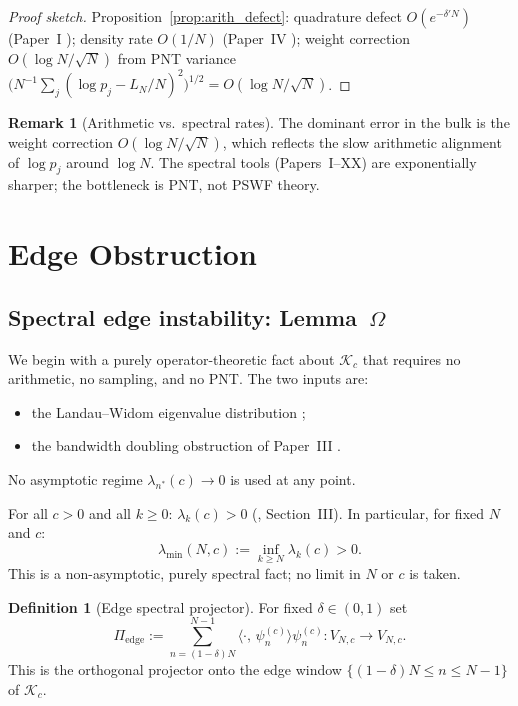 \documentclass[12pt,a4paper]{amsart}
\theoremstyle{definition}
\newtheorem{definition}[theorem]{Definition}
\newtheorem{remark}[theorem]{Remark}
\newcommand{\Kop}{\mathcal{K}_c}
\newcommand{\psin}{\psi_n^{(c)}}
\newcommand{\ip}[2]{\langle #1,\, #2\rangle}
\newcommand{\Pedge}{\Pi_{\mathrm{edge}}}
\newcommand{\lmin}{\lambda_{\min}(N,c)}
\begin{document}
\begin{proof}[Proof sketch]
Proposition~\ref{prop:arith_defect}: quadrature defect
$O(e^{-\delta'N})$ (Paper~I \cite{OldPaperI}); density rate $O(1/N)$
(Paper~IV \cite{PaperIV}); weight correction $O(\log N/\sqrt{N})$
from PNT variance $\bigl(N^{-1}\sum_j(\log p_j - L_N/N)^2\bigr)^{1/2}
= O(\log N/\sqrt{N})$.
\end{proof}

\begin{remark}[Arithmetic vs.~spectral rates]
The dominant error in the bulk is the weight correction
$O(\log N/\sqrt{N})$, which reflects the slow arithmetic alignment
of $\log p_j$ around $\log N$.
The spectral tools (Papers~I--XX) are exponentially sharper;
the bottleneck is PNT, not PSWF theory.
\end{remark}

\section{Edge Obstruction}\label{sec:edge}

\subsection{Spectral edge instability: Lemma~$\Omega$}

We begin with a purely operator-theoretic fact about $\Kop$
that requires no arithmetic, no sampling, and no PNT.
The two inputs are:
\begin{itemize}
  \item the Landau--Widom eigenvalue distribution \cite{Widom1964};
  \item the bandwidth doubling obstruction of Paper~III \cite{PaperIII}.
\end{itemize}
No asymptotic regime $\lambda_{n^*}(c)\to 0$ is used at any point.

\begin{fact}%
\label{fact:lmin}
For all $c > 0$ and all $k \ge 0$: $\lambda_k(c) > 0$
\textnormal{(\cite{Slepian1978}, Section~III)}.
In particular, for fixed $N$ and $c$:
\[
  \lmin := \inf_{k \ge N}\lambda_k(c) > 0.
\]
This is a non-asymptotic, purely spectral fact; no limit
in $N$ or $c$ is taken.
\end{fact}

\begin{definition}[Edge spectral projector]\label{def:pedge}
For fixed $\delta\in(0,1)$ set
\[
  \Pedge := \sum_{n=(1-\delta)N}^{N-1} \ip{\cdot}{\psin}\psin
  : V_{N,c}\to V_{N,c}.
\]
This is the orthogonal projector onto the edge window
$\{(1-\delta)N \le n \le N-1\}$ of $\Kop$.
\end{definition}
\end{document}

